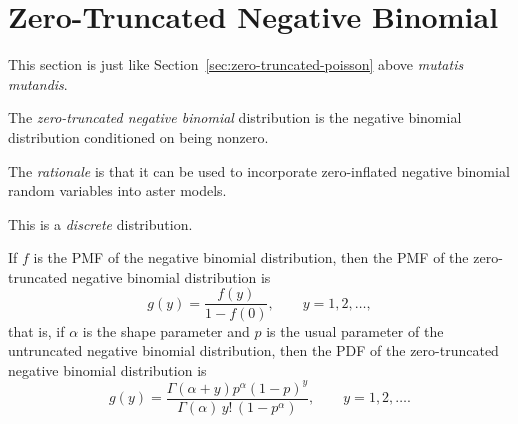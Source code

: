 \section{Zero-Truncated Negative Binomial}

This section is just like Section~\ref{sec:zero-truncated-poisson} above
\emph{mutatis mutandis}.

The \emph{zero-truncated negative binomial} distribution is
the negative binomial distribution conditioned on being nonzero.

The \emph{rationale} is that it can be used to incorporate zero-inflated
negative binomial random variables into aster models.

This is a \emph{discrete} distribution.

\begin{sloppypar}
If $f$ is the PMF of the negative binomial distribution, then the PMF of
the zero-truncated negative binomial distribution is
\begin{equation}
\label{eq:zero-truncated-negative-binomial-pmf-in-terms-of-negative-binomial}
   g(y) = \frac{f(y)}{1 - f(0)},
   \qquad y = 1, 2, \ldots,
\end{equation}
that is, if $\alpha$ is the shape parameter and $p$ is the usual parameter
of the untruncated negative binomial distribution, then
the PDF of the zero-truncated negative binomial distribution is
\begin{equation} \label{eq:zero-truncated-negative-binomial-pmf}
   g(y) =
   \frac{\Gamma(\alpha + y) p^\alpha (1-p)^y}
   {\Gamma(\alpha) \, y! \, (1 - p^\alpha)},
   \qquad y = 1, 2, \ldots.
\end{equation}
\end{sloppypar}

